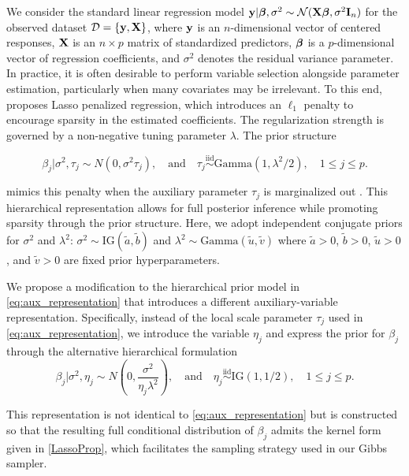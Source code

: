 We consider the standard linear regression model ${\bf y}|{\boldsymbol \beta},\sigma^2 \sim \mathcal{N}({\bf X}{\boldsymbol \beta}, \sigma^2 {\bf I}_n)$ for the observed dataset ${\mathcal D} = \{{\bf y}, {\bf X} \}$, where ${\bf y}$ is an $n$-dimensional vector of centered responses, ${\bf X}$ is an $n \times p$ matrix of standardized predictors, ${\boldsymbol \beta}$ is a $p$-dimensional vector of regression coefficients, and $\sigma^2$ denotes the residual variance parameter. In practice, it is often desirable to perform variable selection alongside parameter estimation, particularly when many covariates may be irrelevant. To this end, \citet{tibshirani1996regression} proposes  Lasso penalized regression, which introduces an $\ell_1$ penalty to encourage sparsity in the estimated coefficients. The regularization strength is governed by a non-negative tuning parameter $\lambda$. The  prior structure 

\begin{equation}\label{eq:aux_representation}
\beta_j| \sigma^2, \tau_j 
    \sim N( 0, \sigma^2 \tau_j),
\quad \mbox{and} \quad
\tau_j 
    \stackrel{\text{iid}}{\sim} \text{Gamma}(1,\lambda^2/2), 
\quad 1\leq j \leq p.
\end{equation}

\noindent 
mimics this penalty when the auxiliary parameter $\tau_j$ is marginalized out \citep{park2008bayesian}.
This hierarchical representation allows for full posterior inference while promoting sparsity through the prior structure. Here, we adopt independent conjugate priors for $\sigma^2$ and $\lambda^2$: $
\sigma^2 \sim \text{IG}(\widetilde{a}, \widetilde{b})$
and $\lambda^2 \sim \mbox{Gamma}(\widetilde{u},\widetilde{v})$
where $\widetilde{a}>0$, $\widetilde{b}>0$, $\widetilde{u}>0$, and $\widetilde{v}>0$ are fixed prior hyperparameters.

We propose a modification to the hierarchical prior model in \eqref{eq:aux_representation} that introduces a different auxiliary-variable representation. Specifically, instead of the local scale parameter 
$\tau_j$ used in \eqref{eq:aux_representation}, we introduce the variable $\eta_j$ and express the prior for $\beta_j$ through the alternative hierarchical formulation
\begin{equation}\label{equ3}
\beta_j | \sigma^2, \eta_j 
    \sim N\left( 0, \frac{\sigma^2}{\eta_j\lambda^2} \right),
\quad \text{and} \quad
\eta_j \stackrel{\text{iid}}{\sim} \text{IG}(1, 1/2), \quad 1 \leq j \leq p.
\end{equation}

This representation is not identical to \eqref{eq:aux_representation} but is constructed so that the resulting full conditional distribution of $\beta_j$ admits the kernel form given in \eqref{LassoProp}, which facilitates the sampling strategy used in our Gibbs sampler.

